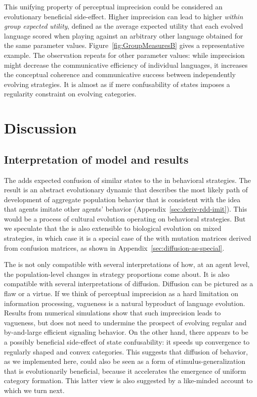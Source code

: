\documentclass[fleqn,reqno,10pt]{article}
\newcommand{\rd}{\acro{rd}} %
\newcommand{\rmd}{\acro{rmd}} %
\newcommand{\rdd}{\acro{rdd}} %
\begin{document}
This unifying property of perceptual imprecision could be considered
an evolutionary beneficial side-effect. Higher imprecision can lead to
higher \emph{within group expected utility}, defined as the average
expected utility that each evolved language scored when playing against an
arbitrary other language obtained for the same parameter values. Figure~\ref{fig:GroupMeasuresB} gives a representative
example. The observation repeats for other parameter values: while
imprecision might decrease the communicative efficiency of individual
languages, it increases the conceptual coherence and communicative
success between independently evolving strategies. It is almost as if
mere confusability of states imposes a regularity constraint on
evolving categories.


\section{Discussion}
\label{sec:discussion}

\subsection{Interpretation of model and results}
\label{sec:model-interpretation}

The \rdd adds expected confusion of similar states to the \rd in behavioral strategies. The
result is an abstract evolutionary dynamic that describes the most likely path of development
of aggregate population behavior that is consistent with the idea that agents imitate other
agents' behavior (Appendix~\ref{sec:deriv-rdd-imit}). This would be a process of cultural
evolution operating on behavioral strategies. But we speculate that the \rdd is also extensible
to biological evolution on mixed strategies, in which case it is a special case of the \rmd
with mutation matrices derived from confusion matrices, as shown in
Appendix~\ref{sec:diffusion-as-special}.

The \rdd is not only compatible with several interpretations of how,
at an agent level, the population-level changes in strategy
proportions come about. It is also compatible with several
interpretations of diffusion. Diffusion can be pictured as a flaw or a
virtue. If we think of perceptual imprecision as a hard limitation on
information processing, vagueness is a natural byproduct of language
evolution. Results from numerical simulations show that such
imprecision leads to vagueness, but does not need to undermine the
prospect of evolving regular and by-and-large efficient signaling
behavior. On the other hand, there appears to be a possibly beneficial
side-effect of state confusability: it speeds up convergence to
regularly shaped and convex categories. This suggests that diffusion
of behavior, as we implemented here, could also be seen as a form
of stimulus-generalization that is evolutionarily beneficial, because
it accelerates the emergence of uniform category formation. This
latter view is also suggested by a like-minded account to which we
turn next.
\end{document}
